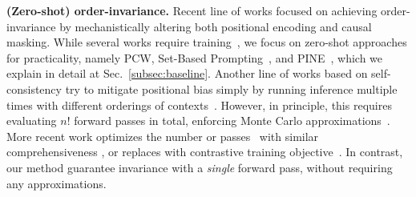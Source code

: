 \noindent \textbf{(Zero-shot) order-invariance.}
Recent line of works focused on achieving order-invariance by mechanistically altering both positional encoding and causal masking.
While several works require training~\cite{junqing2023never, zhu2023judgelm}, we focus on zero-shot approaches for practicality, namely
PCW, Set-Based Prompting~\cite{pcw, setbasedprompting}, and PINE~\cite{pine}, which we explain in detail at Sec.~\ref{subsec:baseline}. %
Another line of works based on self-consistency try to mitigate positional bias simply by running inference multiple times with different orderings of contexts~\cite{zheng2024large}. However, in principle, this requires evaluating \(n!\) forward passes in total, enforcing Monte Carlo approximations~\citep{tang2024middlepermutationselfconsistencyimproves}. More recent work optimizes the number or passes~\citep{lee2024inference} with similar comprehensiveness \citep{hwang2007optimizing}, or replaces with contrastive training objective~\cite{lee2024cord}. In contrast, our method guarantee invariance with a \textit{single} forward pass, without requiring any approximations.

